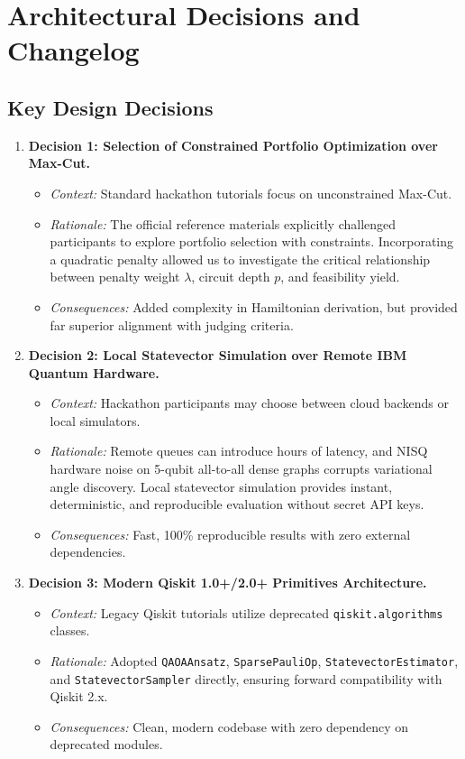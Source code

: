 \section{Architectural Decisions and Changelog}

\subsection{Key Design Decisions}
\begin{enumerate}
    \item \textbf{Decision 1: Selection of Constrained Portfolio Optimization over Max-Cut.}
    \begin{itemize}
        \item \textit{Context:} Standard hackathon tutorials focus on unconstrained Max-Cut.
        \item \textit{Rationale:} The official reference materials explicitly challenged participants to explore portfolio selection with constraints. Incorporating a quadratic penalty allowed us to investigate the critical relationship between penalty weight $\lambda$, circuit depth $p$, and feasibility yield.
        \item \textit{Consequences:} Added complexity in Hamiltonian derivation, but provided far superior alignment with judging criteria.
    \end{itemize}
    \item \textbf{Decision 2: Local Statevector Simulation over Remote IBM Quantum Hardware.}
    \begin{itemize}
        \item \textit{Context:} Hackathon participants may choose between cloud backends or local simulators.
        \item \textit{Rationale:} Remote queues can introduce hours of latency, and NISQ hardware noise on 5-qubit all-to-all dense graphs corrupts variational angle discovery. Local statevector simulation provides instant, deterministic, and reproducible evaluation without secret API keys.
        \item \textit{Consequences:} Fast, 100\% reproducible results with zero external dependencies.
    \end{itemize}
    \item \textbf{Decision 3: Modern Qiskit 1.0+/2.0+ Primitives Architecture.}
    \begin{itemize}
        \item \textit{Context:} Legacy Qiskit tutorials utilize deprecated \texttt{qiskit.algorithms} classes.
        \item \textit{Rationale:} Adopted \texttt{QAOAAnsatz}, \texttt{SparsePauliOp}, \texttt{StatevectorEstimator}, and \texttt{StatevectorSampler} directly, ensuring forward compatibility with Qiskit 2.x.
        \item \textit{Consequences:} Clean, modern codebase with zero dependency on deprecated modules.
    \end{itemize}
\end{enumerate}
